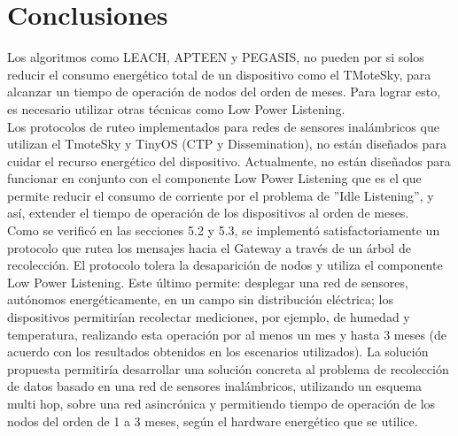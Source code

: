 


\section{Conclusiones}
Los algoritmos como LEACH, APTEEN y PEGASIS, no pueden por si solos reducir el consumo energético total de un dispositivo como el TMoteSky, para alcanzar un tiempo de operación de nodos del orden de meses. Para lograr esto, es necesario utilizar otras técnicas como Low Power Listening.\\

Los protocolos de ruteo implementados para redes de sensores inalámbricos que utilizan el TmoteSky y TinyOS (CTP y Dissemination), no están diseñados para cuidar el recurso energético del dispositivo. Actualmente, no están diseñados para funcionar en conjunto con el componente Low Power Listening que es el que permite reducir el consumo de corriente por el problema de ''Idle Listening'', y así, extender el tiempo de operación de los dispositivos al orden de meses. \\

Como se verificó en las secciones 5.2 y 5.3, se implementó satisfactoriamente un protocolo que rutea los mensajes hacia el Gateway a través de un árbol de recolección. El protocolo tolera la desaparición de nodos y utiliza el componente Low Power Listening. Este último permite: desplegar una red de sensores, autónomos energéticamente, en un campo sin distribución eléctrica; los dispositivos permitirían recolectar mediciones, por ejemplo, de humedad y temperatura, realizando esta operación por al menos un mes y hasta 3 meses (de acuerdo con los resultados obtenidos en los escenarios utilizados). La solución propuesta permitiría desarrollar una solución concreta al problema de recolección de datos basado en una red de sensores inalámbricos, utilizando un esquema multi hop, sobre una red asincrónica y permitiendo tiempo de operación de los nodos del orden de 1 a 3 meses, según el hardware energético que se utilice.